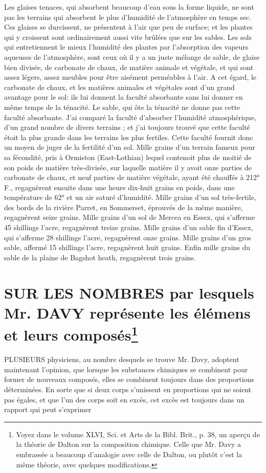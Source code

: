 Les glaises tenaces, qui absorbent beaucoup d'eau sous la forme liquide, ne sont pas les terrains qui absorbent le plus d'humidité de l'atmosphère en temps sec. Ces glaises se durcissent, ne présentent à l'air que peu de surface; et les plantes qui y croissent sont ordinairement aussi vite brûlées que sur les sables.
Les sols qui entretiennent le mieux l'humidité des plantes par l'absorption des vapeurs aqueuses de l'atmosphère, sont ceux où il y a un juste mélange de sable, de glaise bien divisée, de carbonate de chaux, de matière animale et végétale, et qui sont assez légers, assez meubles pour être aisément perméables à l'air. A cet égard, le\setcounter{page}{449} carbonate de chaux, et les matières animales et végétales sont d'un grand avantage pour le sol: ils lui donnent la faculté absorbante sans lui donner en même temps de la ténacité. Le sable, qui ôte la ténacité ne donne pas cette faculté absorbante.
J'ai comparé la faculté d'absorber l'humidité atmosphérique, d'un grand nombre de divers terrains ; et j'ai toujours trouvé que cette faculté étoit la plus grande dans les terrains les plus fertiles. Cette faculté fournit donc un moyen de juger de la fertilité d'un sol.
Mille grains d'un terrain fameux pour sa fécondité, pris à Ormiston (East-Lothian) lequel contenoit plus de moitié de son poids de matière très-divisée, sur laquelle matière il y avoit onze parties de carbonate de chaux, et neuf parties de matière végétale, ayant été chauffés à 212° F., regagnèrent ensuite dans une heure dix-huit grains en poids, dans une température de 62° et un air saturé d'humidité.
Mille grains d'un sol très-fertile, des bords de la rivière Parret, en Sommerset, éprouvés de la même manière, regagnèrent seize grains.
Mille grains d'un sol de Mercea en Essex, qui s'afferme 45 shillings l'acre, regagnèrent treize grains.
Mille grains d'un sable fin d'Essex, qui\setcounter{page}{450} s'afferme 28 shillings l'acre, regagnèrent onze grains.
Mille grains d'un gros sable, affermé 15 shillings l'acre, regagnèrent huit grains.
Enfin mille grains du sable de la plaine de Bagshot heath, regagnèrent trois grains.
\section{SUR LES NOMBRES par lesquels Mr. DAVY représente les élémens et leurs composés\footnote{Voyez dans le volume XLVI, Sci. et Arts de la Bibl. Brit., p. 38, un aperçu de la théorie de Dalton sur la composition chimique. Celle que Mr. Davy a embrassée a beaucoup d'analogie avec celle de Dalton, ou plutôt c'est la même théorie, avec quelques modifications.}}
PLUSIEURS physiciens, au nombre desquels se trouve Mr. Davy, adoptent maintenant l'opinion, que lorsque les substances chimiques se combinent pour former de nouveaux composés, elles se combinent toujours dans des proportions déterminées. En sorte que si deux corps s'unissent en proportions qui ne soient pas égales, et que l'un des corps soit en excès, cet excès est toujours dans un rapport qui peut s'exprimer